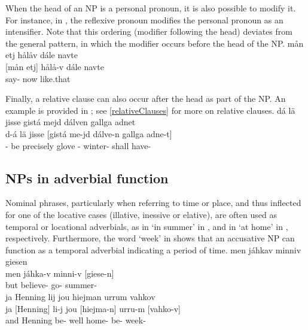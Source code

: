 When the head of an NP is a personal pronoun, it is also possible to modify it. For instance, in , the  reflexive pronoun  modifies the  personal pronoun  as an intensifier. Note that this ordering (modifier following the head) deviates from the general pattern, in which the modifier occurs before the head of the NP. 
\ea\label{NPstructureProEx3}%
\glll	mån etj hålåv dále navte\\
	{[mån} {etj]\subNP} hålå-v dále navte\\
	 \BS{} say- now like.that\\\nopagebreak
{}	
\z

Finally, a relative clause can also occur after the head as part of the NP. An example is provided in ; see \SEC\ref{relativeClauses} for more on relative clauses. 
\ea\label{NPstructureRelClEx1}%
\glll	dá lä jisse gistá mejd dálven gallga adnet\\
	d-á lä jisse {[gistá} me-jd dálve-n gallga {adne-t]\subNP}\\
	\BS{}- be\BS{} precisely glove\BS{} - winter- shall\BS{} have-\\\nopagebreak
{}	
\z


\subsection{NPs in adverbial function}\label{ADVnouns}
Nominal phrases, %
particularly when referring to time or place, and thus inflected for one of the locative cases (illative, inessive or elative), are often used as temporal or locational adverbials, as in  ‘in summer’ in , and in  ‘at home’ in , respectively. Furthermore, the word  ‘week’ in  shows that an accusative NP can function as a temporal adverbial indicating a period of time. 
\ea\label{ADVnounsEx1}%
\glll	men jáhkav minniv giesen\\
	men jáhka-v minni-v {[giese-n]\subNP}\\
	but believe- go- summer-\\\nopagebreak
{}	
\z
\ea\label{ADVnounsEx2}
\glll	ja Henning lij jou hiejman urrum vahkov\\
	ja {[Henning]\subNP{}} li-j jou {[hiejma-n]\subNP{}} urru-m {[vahko-v]\subNP{}}\\
	and Henning\BS{} be- well home- be- week-\\\nopagebreak
{}	
\z

